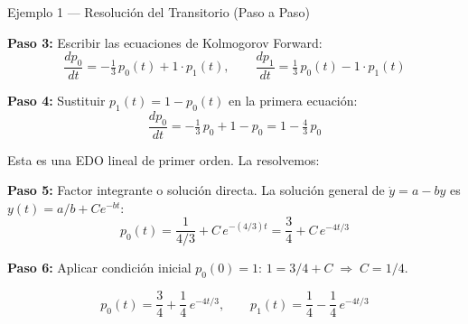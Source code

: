\documentclass[aspectratio=1610, 9pt]{beamer}
\begin{document}
\begin{frame}{Ejemplo 1 --- Resoluci\'on del Transitorio (Paso a Paso)}

\textbf{Paso 3:} Escribir las ecuaciones de Kolmogorov Forward:
\[
\frac{dp_0}{dt} = -\tfrac{1}{3}\,p_0(t) + 1 \cdot p_1(t), \qquad 
\frac{dp_1}{dt} = \tfrac{1}{3}\,p_0(t) - 1 \cdot p_1(t)
\]

\textbf{Paso 4:} Sustituir $p_1(t) = 1 - p_0(t)$ en la primera ecuaci\'on:
\[
\frac{dp_0}{dt} = -\tfrac{1}{3}\,p_0 + 1 - p_0 = 1 - \tfrac{4}{3}\,p_0
\]

Esta es una EDO lineal de primer orden. La resolvemos:

\textbf{Paso 5:} Factor integrante o soluci\'on directa. La soluci\'on general de $\dot{y} = a - by$ es $y(t) = a/b + Ce^{-bt}$:
\[
p_0(t) = \frac{1}{4/3} + C\,e^{-(4/3)t} = \frac{3}{4} + C\,e^{-4t/3}
\]

\textbf{Paso 6:} Aplicar condici\'on inicial $p_0(0) = 1$: \quad $1 = 3/4 + C \;\Rightarrow\; C = 1/4$.

\begin{resultadobox}
\[
p_0(t) = \frac{3}{4} + \frac{1}{4}\,e^{-4t/3}, \qquad p_1(t) = \frac{1}{4} - \frac{1}{4}\,e^{-4t/3}
\]
\end{resultadobox}
\end{frame}
\end{document}
